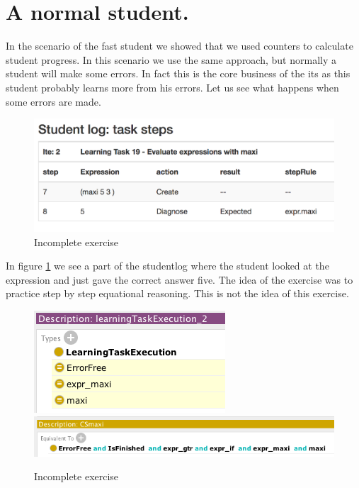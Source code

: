 \section{A normal student.}
In the scenario of the fast student we showed that we used counters to calculate student progress.
In this scenario we use the same approach, but normally a student will make some errors.
In fact this is the core business of the \gls{its} as this student probably learns more from his errors.
Let us see what happens when some errors are made.

\begin{figure}
\includegraphics[scale=0.7]{pictures/screen10.png}
\caption{Incomplete exercise}
\label{fig:onto07}
\end{figure}

In figure \ref{fig:onto07} we see a part of the studentlog where the student looked at the expression and just gave the correct answer five.
The idea of the exercise was to practice step by step equational reasoning.
This is not the idea of this exercise. 

\begin{figure}
\includegraphics[scale=0.7]{pictures/screen11.png}\\
\includegraphics[scale=0.7]{pictures/screen12.png}
\caption{Incomplete exercise}
\label{fig:onto08}
\end{figure}

